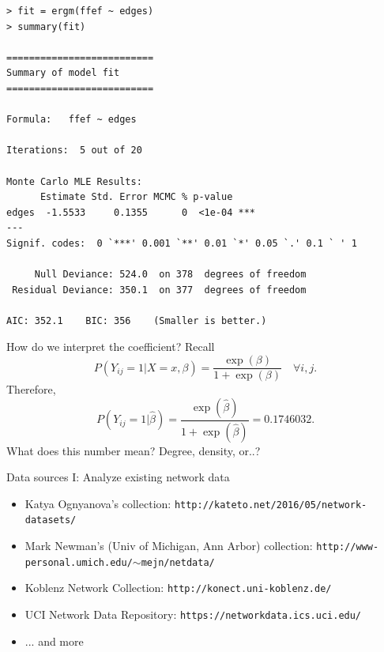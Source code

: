\documentclass[10pt]{beamer}
\begin{document}
\begin{frame}[fragile]
\begin{verbatim}
> fit = ergm(ffef ~ edges)
> summary(fit)

==========================
Summary of model fit
==========================

Formula:   ffef ~ edges

Iterations:  5 out of 20 

Monte Carlo MLE Results:
      Estimate Std. Error MCMC % p-value    
edges  -1.5533     0.1355      0  <1e-04 ***
---
Signif. codes:  0 `***' 0.001 `**' 0.01 `*' 0.05 `.' 0.1 ` ' 1

     Null Deviance: 524.0  on 378  degrees of freedom
 Residual Deviance: 350.1  on 377  degrees of freedom
 
AIC: 352.1    BIC: 356    (Smaller is better.) 
\end{verbatim}
\end{frame}

\begin{frame}
How do we interpret the coefficient? Recall
	\begin{equation}
	P(Y_{ij}=1 | X=x,\beta) = \frac{\exp(\beta)}{1+\exp(\beta)} \quad \forall i,j.
	\end{equation}
Therefore,
	\begin{equation}
	P(Y_{ij}=1 | \hat{\beta}) = \frac{\exp(\hat{\beta})}{1+\exp(\hat{\beta})}=0.1746032.
	\end{equation}
What does this number mean?  Degree, density, or..?
\end{frame}

\begin{frame}{Data sources I: Analyze existing network data}
	\begin{itemize}	
	\item Katya Ognyanova's collection: \texttt{http://kateto.net/2016/05/network-datasets/}\\
	\item Mark Newman's (Univ of Michigan, Ann Arbor) collection: \texttt{http://www-personal.umich.edu/$\sim$mejn/netdata/}
	\item Koblenz Network Collection: \texttt{http://konect.uni-koblenz.de/}
	\item UCI Network Data Repository: \texttt{https://networkdata.ics.uci.edu/}
	\item ... and more
	\end{itemize}
\end{frame}
\end{document}

